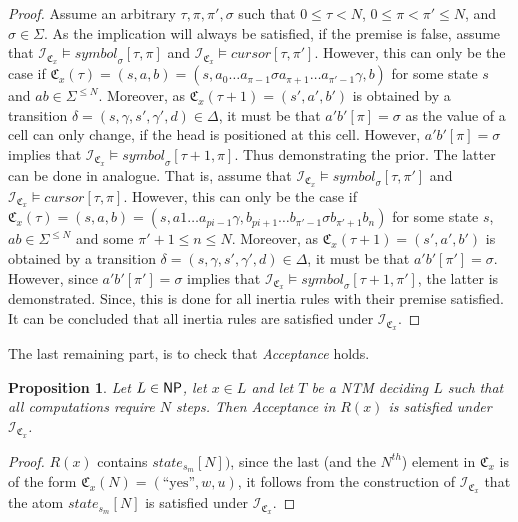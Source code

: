 \documentclass [11pt]{article}
\newtheorem{proposition}[theorem]{Proposition}
\newcommand{\yess}{\mbox{``yes''}}
\newcommand{\ccfont}[1]{\protect\mathsf{#1}}
\newcommand{\NP}{\ccfont{NP}}
\newcommand{\sym}[3]{\textit{symbol}_{#1}[#2,#3]}
\newcommand{\cursor}[2]{\textit{cursor}[#1,#2]}
\newcommand{\state}[2]{\textit{state}_{#1}[#2]}
\newcommand{\sequ}[1]{\mathfrak{C}_{#1}}
\newcommand{\sequint}[2]{ \mathcal{#1}_{\mathfrak{C}_{#2}}}
\begin{document}
\begin{proof}
Assume an arbitrary $\tau, \pi, \pi', \sigma$ such that $0 \leq \tau < N$, $0 \leq \pi < \pi' \leq N$, and $\sigma \in \Sigma$.
As the implication will always be satisfied, if the premise is false, assume that $\sequint{I}{x} \models   \sym{\sigma}{\tau}{\pi} $ and $\sequint{I}{x} \models   \cursor{\tau}{\pi'}$. However, this can only be the case
if $\sequ{x}(\tau)=(s, a, b) =(s, a_0 \dots a_{\pi-1} \sigma a_{\pi+1} \dots a_{\pi'-1} \gamma, b)$ for some state $s$ and $ab\in \Sigma^{\leq N} $. Moreover, as $\sequ{x}(\tau+1)= (s', a', b')$ is obtained by a transition $\delta=(s,\gamma,s',\gamma',d) \in \Delta$, it must be that $a'b'[\pi]=\sigma$ as the value of a cell can only change, if the head is positioned at this cell. However, $a'b'[\pi]=\sigma$ implies that $\sequint{I}{x} \models \sym{\sigma}{\tau+1}{\pi}$. Thus demonstrating the prior. 
The latter can be done in analogue. That is, 
 assume that $\sequint{I}{x} \models   \sym{\sigma}{\tau}{\pi'} $ and $\sequint{I}{x} \models   \cursor{\tau}{\pi}$. However, this can only be the case
if $\sequ{x}(\tau)=(s, a, b) =(s, a1 \dots a_{pi-1}\gamma, b_{pi+1} \dots b_{\pi'-1} \sigma b_{\pi'+1} b_n)$ for some state $s$, $ab \in \Sigma^{\leq N} $ and some $\pi'+1 \leq n \leq N$. Moreover, as $\sequ{x}(\tau+1)= (s', a', b')$ is obtained by a transition $\delta=(s,\gamma,s',\gamma',d) \in \Delta$, it must be that $a'b'[\pi']=\sigma$. However, since $a'b'[\pi']=\sigma$ implies that $\sequint{I}{x} \models \sym{\sigma}{\tau+1}{\pi'}$, the latter is demonstrated. 
Since, this is done for all inertia rules with their premise satisfied. It can be concluded that all inertia rules are satisfied under $\sequint{I}{x} $.
\end{proof}

The last remaining part, is to check that \emph{Acceptance} holds.

\begin{proposition}
\label{prop:r-accept}
Let $L \in \NP$, let $x \in L$ and let $T$ be a NTM deciding $L$ such that all computations require $N$ steps. Then \emph{Acceptance} in $R(x)$ is satisfied under $\sequint{I}{x}$.
\end{proposition}
\begin{proof}
$R(x)$ contains $\state{s_m}{N})$, since the last (and the $N^{th}$) element in $\sequ{x}$ is of the form $\sequ{x}(N)=(\yess, w,u)$, it follows from the construction of $\sequint{I}{x}$ that the atom $\state{s_m}{N}$ is satisfied under $\sequint{I}{x}$.
\end{proof}
\end{document}
